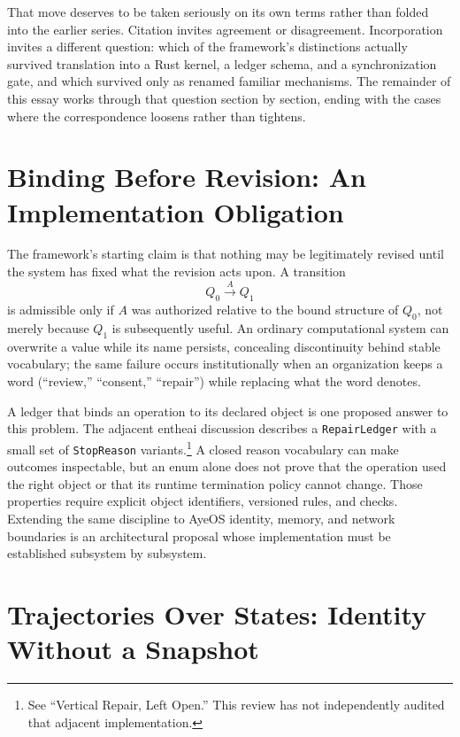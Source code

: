 \documentclass[11pt]{article}
\begin{document}
That move deserves to be taken seriously on its own terms rather than folded into the earlier series. Citation invites agreement or disagreement. Incorporation invites a different question: which of the framework's distinctions actually survived translation into a Rust kernel, a ledger schema, and a synchronization gate, and which survived only as renamed familiar mechanisms. The remainder of this essay works through that question section by section, ending with the cases where the correspondence loosens rather than tightens.

\section{Binding Before Revision: An Implementation Obligation}

The framework's starting claim is that nothing may be legitimately revised until the system has fixed what the revision acts upon. A transition
\[
Q_0 \xrightarrow{A} Q_1
\]
is admissible only if $A$ was authorized relative to the bound structure of $Q_0$, not merely because $Q_1$ is subsequently useful. An ordinary computational system can overwrite a value while its name persists, concealing discontinuity behind stable vocabulary; the same failure occurs institutionally when an organization keeps a word (``review,'' ``consent,'' ``repair'') while replacing what the word denotes.

A ledger that binds an operation to its declared object is one proposed answer to this problem. The adjacent entheai discussion describes a \texttt{RepairLedger} with a small set of \texttt{StopReason} variants.\footnote{See ``Vertical Repair, Left Open.'' This review has not independently audited that adjacent implementation.} A closed reason vocabulary can make outcomes inspectable, but an enum alone does not prove that the operation used the right object or that its runtime termination policy cannot change. Those properties require explicit object identifiers, versioned rules, and checks. Extending the same discipline to AyeOS identity, memory, and network boundaries is an architectural proposal whose implementation must be established subsystem by subsystem.

\section{Trajectories Over States: Identity Without a Snapshot}
\end{document}
